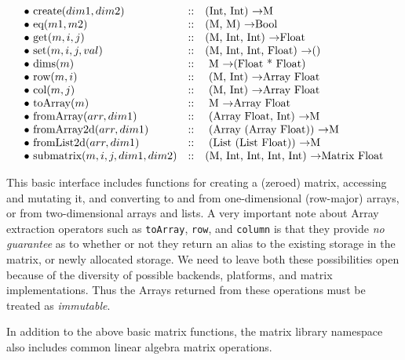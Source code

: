 \[
\begin{array}{lcl}
\bullet$ $ $create$(dim1,dim2)     & :: &  $(Int, Int)                \ra   M$   \\
\bullet$ $ $eq$(m1, m2)            & :: &  $(M, M)          \ra   Bool$   \\
\bullet$ $ $get$(m, i, j)    & :: &  $(M, Int, Int)        \ra   Float$   \\
\bullet$ $ $set$(m, i, j, val)     & :: &  $(M, Int, Int, Float) \ra   ()$ \\
\bullet$ $ $dims$(m)               & :: &  $ M                   \ra   (Float * Float)$ \\
\bullet$ $ $row$(m,i)              & :: &  $ (M, Int)            \ra   Array Float$ \\
\bullet$ $ $col$(m,j)              & :: &  $ (M, Int)            \ra   Array Float$ \\
\bullet$ $ $toArray$(m)            & :: &  $ M                   \ra   Array Float $ \\
\bullet$ $ $fromArray$(arr,dim1)   & :: &  $ (Array Float, Int)       \ra   M $ \\
\bullet$ $ $fromArray2d$(arr,dim1) & :: &  $ (Array (Array Float))    \ra   M $ \\
\bullet$ $ $fromList2d$(arr,dim1)  & :: &  $ (List (List Float))    \ra   M $ \\

\bullet$ $ $submatrix$(m, i, j, dim1, dim2) & :: &  $(M, Int, Int, Int, Int) \ra Matrix Float$   \\
\end{array}
\]

This basic interface includes functions for creating a (zeroed)
matrix, accessing and mutating it, and converting to and from
one-dimensional (row-major) arrays, or from two-dimensional arrays and
lists.  A very important note about Array extraction operators such as
{\tt toArray}, {\tt row}, and {\tt column} is that they provide {\em
no guarantee} as to whether or not they return an alias to the
existing storage in the matrix, or newly allocated storage.  We need
to leave both these possibilities open because of the diversity of
possible backends, platforms, and matrix implementations.  Thus the
Arrays returned from these operations must be treated as {\em
immutable}.

In addition to the above basic matrix functions, the matrix library
namespace also includes common linear algebra matrix operations.

